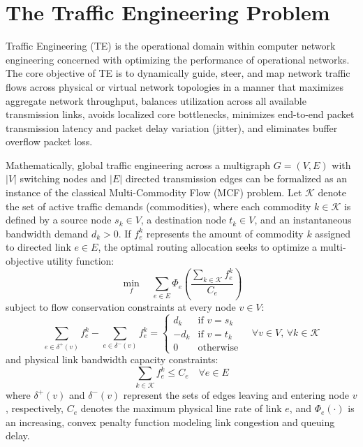 \documentclass[12pt,a4paper,oneside]{report}
\begin{document}
\section{The Traffic Engineering Problem}
Traffic Engineering (TE) is the operational domain within computer network engineering concerned with optimizing the performance of operational networks. The core objective of TE is to dynamically guide, steer, and map network traffic flows across physical or virtual network topologies in a manner that maximizes aggregate network throughput, balances utilization across all available transmission links, avoids localized core bottlenecks, minimizes end-to-end packet transmission latency and packet delay variation (jitter), and eliminates buffer overflow packet loss.

Mathematically, global traffic engineering across a multigraph $G = (V, E)$ with $|V|$ switching nodes and $|E|$ directed transmission edges can be formalized as an instance of the classical Multi-Commodity Flow (MCF) problem. Let $\mathcal{K}$ denote the set of active traffic demands (commodities), where each commodity $k \in \mathcal{K}$ is defined by a source node $s_k \in V$, a destination node $t_k \in V$, and an instantaneous bandwidth demand $d_k > 0$. If $f_e^k$ represents the amount of commodity $k$ assigned to directed link $e \in E$, the optimal routing allocation seeks to optimize a multi-objective utility function:
\begin{equation}
    \min_{f} \quad \sum_{e \in E} \Phi_e\left( \frac{\sum_{k \in \mathcal{K}} f_e^k}{C_e} \right)
    \label{eq:te_general_objective}
\end{equation}
subject to flow conservation constraints at every node $v \in V$:
\begin{equation}
    \sum_{e \in \delta^+(v)} f_e^k - \sum_{e \in \delta^-(v)} f_e^k = \begin{cases}
        d_k & \text{if } v = s_k \\
        -d_k & \text{if } v = t_k \\
        0 & \text{otherwise}
    \end{cases} \quad \forall v \in V, \, \forall k \in \mathcal{K}
    \label{eq:flow_conservation_intro}
\end{equation}
and physical link bandwidth capacity constraints:
\begin{equation}
    \sum_{k \in \mathcal{K}} f_e^k \le C_e \quad \forall e \in E
    \label{eq:capacity_constraint_intro}
\end{equation}
where $\delta^+(v)$ and $\delta^-(v)$ represent the sets of edges leaving and entering node $v$, respectively, $C_e$ denotes the maximum physical line rate of link $e$, and $\Phi_e(\cdot)$ is an increasing, convex penalty function modeling link congestion and queuing delay.
\end{document}
